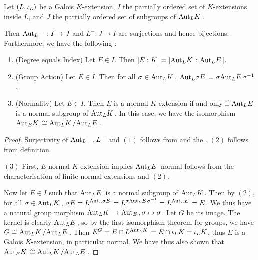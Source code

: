 \documentclass[main.tex]{subfiles}
\begin{document}
\begin{thm}  

  Let $(L,\io_L)$ be a Galois $K$-extension,
  $I$ the partially ordered set of $K$-extensions inside $L$, 
  and $J$ the partially ordered set of subgroups of $\aut{K}{L}$. 

  Then $\aut{-}{L} : I \to J$ and $L^{-} : J \to I$ are surjections
  and hence bijections. 
  Furthermore, we have the following : 
  \begin{enumerate}
    \item (Degree equals Index) Let $E \in I$. 
    Then $[E : K] = [\aut{K}{L} : \aut{E}{L}]$.
    \item (Group Action) Let $E \in I$. 
    Then for all $\sigma \in \aut{K}{L}$, 
    $\aut{\sigma E}{L} = \sigma \aut{E}{L} \sigma^{-1}$. 
    \item (Normality) Let $E \in I$. 
    Then $E$ is a normal $K$-extension if and only if 
    $\aut{E}{L}$ is a normal subgroup of $\aut{K}{L}$. 
    In this case, we have the isomorphism 
    $\aut{K}{E} \cong \aut{K}{L} / \aut{E}{L}$. 
  \end{enumerate}
\end{thm}
\begin{proof}
  Surjectivity of $\aut{-}{L}, L^-$ and $(1)$ follows from 
   and 
  the . 
  $(2)$ follows from definition. 

  $(3)$ First, $E$ normal $K$-extension implies $\aut{E}{L}$ normal 
  follows from the 
  {characterisation of finite normal extensions} and $(2)$. 

  Now let $E \in I$ such that 
  $\aut{E}{L}$ is a normal subgroup of $\aut{K}{L}$.
  Then by $(2)$, for all $\sigma \in \aut{K}{L}$, 
  $\sigma E = L^{\aut{\sigma E}{L}} = L^{\sigma \aut{E}{L} \sigma^{-1}}
  = L^{\aut{E}{L}} = E$.
  We thus have a natural group morphism 
  $\aut{K}{L} \to \aut{}{E}, \sigma \mapsto \sigma$.
  Let $G$ be its image. 
  The kernel is clearly $\aut{E}{L}$, 
  so by the first isomorphism theorem for groups, 
  we have $G \iso \aut{K}{L} / \aut{E}{L}$.
  Then $E^{G} = E \cap L^{\aut{K}{L}} = E \cap \io_L K = \io_L K$,
  thus $E$ is a Galois $K$-extension, in particular normal. 
  We have thus also shown that $\aut{K}{E} \cong \aut{K}{L} / \aut{E}{L}$. 

\end{proof}
\end{document}
